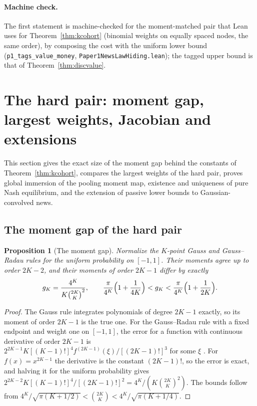 \documentclass[12pt]{article}
\newtheorem{proposition}[theorem]{Proposition}
\theoremstyle{definition}
\theoremstyle{remark}
\begin{document}
\paragraph{Machine check.} The first statement is machine-checked for the moment-matched pair that Lean uses for Theorem~\ref{thm:kcohort} (binomial weights on equally spaced nodes, the same order), by composing the cost with the uniform lower bound (\texttt{p1\_tags\_value\_money}, \nolinkurl{Paper1NewsLawHiding.lean}); the tagged upper bound is that of Theorem~\ref{thm:discvalue}.

\section{The hard pair: moment gap, largest weights, Jacobian and extensions}\label{app:openres}

This section gives the exact size of the moment gap behind the constants of Theorem~\ref{thm:kcohort}, compares the largest weights of the hard pair, proves global immersion of the pooling moment map, existence and uniqueness of pure Nash equilibrium, and the extension of passive lower bounds to Gaussian-convolved news.

\subsection{The moment gap of the hard pair}

\begin{proposition}[The moment gap]\label{prop:gap}
Normalize the $K$-point Gauss and Gauss--Radau rules for the uniform probability on $[-1,1]$. Their moments agree up to order $2K-2$, and their moments of order $2K-1$ differ by exactly
\[
g_K=\frac{4^K}{K\binom{2K}{K}^2},\qquad \frac{\pi}{4^K}\Bigl(1+\frac1{4K}\Bigr)<g_K<\frac{\pi}{4^K}\Bigl(1+\frac1{2K}\Bigr).
\]
\end{proposition}

\begin{proof}
The Gauss rule integrates polynomials of degree $2K-1$ exactly, so its moment of order $2K-1$ is the true one. For the Gauss--Radau rule with a fixed endpoint and weight one on $[-1,1]$, the error for a function with continuous derivative of order $2K-1$ is $2^{2K-1}K[(K-1)!]^4f^{(2K-1)}(\xi)/[(2K-1)!]^3$ for some $\xi$ \citep[25.4.31]{abramowitz1964}. For $f(x)=x^{2K-1}$ the derivative is the constant $(2K-1)!$, so the error is exact, and halving it for the uniform probability gives $2^{2K-2}K[(K-1)!]^4/[(2K-1)!]^2=4^K/(K\binom{2K}{K}^2)$. The bounds follow from $4^K/\sqrt{\pi(K+1/2)}<\binom{2K}{K}<4^K/\sqrt{\pi(K+1/4)}$.
\end{proof}
\end{document}
